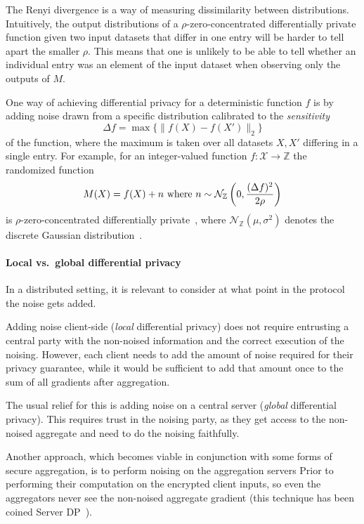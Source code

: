 \documentclass{article}
\begin{document}
The Renyi divergence is a way of measuring dissimilarity between distributions. Intuitively, the output distributions of a $\rho$-zero-concentrated differentially private function given two input datasets that differ in one entry will be harder to tell apart the smaller $\rho$. This means that one is unlikely to be able to tell whether an individual entry was an element of the input dataset when observing only the outputs of $M$.

One way of achieving differential privacy for a deterministic function $f$ is by adding noise drawn from a specific distribution calibrated to the \textit{sensitivity} 
$$\Delta f=\max\{\|f(X)-f(X')\|_2\}$$
of the function, where the maximum is taken over all datasets $X,X'$ differing in a single entry. For example, for an integer-valued function $f:\mathcal X\rightarrow \mathbb Z$ the randomized function
$$M(X) = f(X) + n \textnormal{ where } n \sim \mathcal N_\mathbb{Z}\left(0,\frac{(\Delta f)^2}{2\rho}\right)$$
is $\rho$-zero-concentrated differentially private~\cite[Proposition 1.6]{DBLP:journals/corr/abs-2004-00010}, where $\mathcal N_\mathbb{Z}(\mu, \sigma^2)$ denotes the discrete Gaussian distribution~\cite{DBLP:journals/corr/abs-2004-00010}.

\paragraph{Local vs.\ global differential privacy} In a distributed setting, it is relevant to consider at what point in the protocol the noise gets added.

Adding noise client-side (\textit{local} differential privacy) does not require entrusting a central party with the non-noised information and the correct execution of the noising. However, each client needs to add the amount of noise required for their privacy guarantee, while it would be sufficient to add that amount once to the sum of all gradients after aggregation.

The usual relief for this is adding noise on a central server (\textit{global} differential privacy). This requires trust in the noising party, as they get access to the non-noised aggregate and need to do the noising faithfully.

Another approach, which becomes viable in conjunction with some forms of secure aggregation, is
to perform noising on the aggregation servers Prior to performing their computation on the encrypted
client inputs, so even the aggregators never see the non-noised aggregate gradient (this
technique has been coined Server DP~\cite{dprio}).
\end{document}
